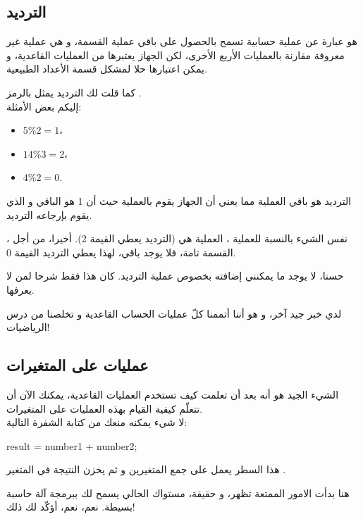 \subsection{الترديد}

هو عبارة عن عملية حسابية تسمح بالحصول على باقي عملية القسمة، و هي عملية غير معروفة مقارنة بالعمليات الأربع الأخرى، لكن الجهاز يعتبرها من العمليات القاعدية، و يمكن اعتبارها حلا لمشكل قسمة الأعداد الطبيعية.

كما قلت لك الترديد يمثل بالرمز
\InlineCode{\%}.\\
إليكم بعض الأمثلة:

\begin{itemize}
  \item $ 5 \% 2 = 1 $،
  \item $ 14 \% 3 = 2 $،
  \item $ 4 \% 2 = 0 $.
\end{itemize}

الترديد
هو باقي العملية
مما يعني أن الجهاز يقوم بالعملية
حيث أن 1 هو الباقي و الذي يقوم بإرجاعه الترديد.

نفس الشيء بالنسبة للعملية
،
العملية هي
(الترديد يعطي القيمة  2). أخيرا، من أجل
،
القسمة تامة، فلا يوجد باقي، لهذا يعطي الترديد القيمة 0.

حسنا، لا يوجد ما يمكنني إضافته بخصوص عملية الترديد. كان هذا فقط شرحا لمن لا يعرفها.

لدي خبر جيد آخر، و هو أننا أتممنا كلّ عمليات الحساب القاعدية و تخلصنا من درس الرياضيات!

\subsection{عمليات على المتغيرات}

الشيء الجيد هو أنه بعد أن تعلمت كيف تستخدم العمليات القاعدية، يمكنك الآن أن تتعلّم كيفية القيام بهذه العمليات على المتغيرات.\\
لا شيء يمكنه منعك من كتابة الشفرة التالية:

\begin{Csource}
  result = number1 + number2;
\end{Csource}

هذا السطر يعمل على جمع المتغيرين
و
ثم يخزن النتيجة في المتغير
.

هنا بدأت الامور الممتعة تظهر، و حقيقة، مستواك الحالي يسمح لك ببرمجة آلة حاسبة بسيطة. نعم، نعم، أؤكّد لك ذلك!

